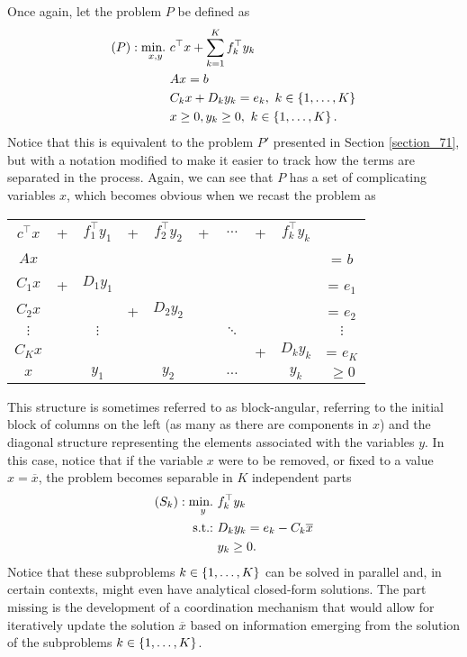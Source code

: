 Once again, let the problem $P$ be defined as
%
\begin{align*}
	(P) :\mathop{\text{min.~}}_{x,y} & c^\top x + \sum_{k=1}^K f_k^\top y_k \\
		  			 & Ax = b \\
		  			 & C_k x + D_k y_k = e_k, \ k \in \left\{ 1, \dots, K \right \} \\
		  			 & x \geq 0, y_k \geq 0, \ k \in \left\{ 1,\dots, K \right \}. 
\end{align*}
%
Notice that this is equivalent to the problem $P'$ presented in Section \ref{section_71}, but with a notation modified to make it easier to track how the terms are separated in the process. Again, we can see that $P$ has a set of complicating variables $x$, which becomes obvious when we recast the problem as
%
\begin{center}
	\begin{tabular}{cccccccccc}
		 $c^\top x$ & + & $f_1^\top y_1$ & + & $f_2^\top y_2$ & + & $\dots$ & + & $f_k^\top y_k$  &  \\
	 	 $Ax$       &   &                &   &                &   &         &   &                 & = $b$ \\
		 $C_1 x$    & + & $D_1 y_1$      &   &                &   &         &   &                 & = $e_1$  \\
		 $C_2 x$    &   &                & + & $D_2 y_2$      &   &         &   &                 & = $e_2$    \\
		 $\vdots$   &   &  $\vdots$      &   &                &   & $\ddots$&   &                 &  $\vdots$   \\
		 $C_K x$    &   &                &   &                &   &         & + & $D_k y_k$       & = $e_K$  \\
		 $x$        &   & $y_1$          &   &  $y_2$         &   & $\dots$ &   & $y_k$           & $\geq 0$  
	\end{tabular}	
\end{center}
 
This structure is sometimes referred to as block-angular, referring to the initial block of columns on the left (as many as there are components in $x$) and the diagonal structure representing the elements associated with the variables $y$. In this case, notice that if the variable $x$ were to be removed, or fixed to a value $x = \overline{x}$, the problem becomes separable in $K$ independent parts
% 
\begin{align*} 
	(S_k) : \mathop{\text{min.~}}_y & f_k^\top y_k \\
	\mathop{\text{s.t.:~}} & D_ky_k = e_k - C_k \overline{x} \\
	& y_k \geq 0.
\end{align*}
%
Notice that these subproblems $k \in \left\{ 1,\dots, K \right \}$ can be solved in parallel and, in certain contexts, might even have analytical closed-form solutions. The part missing is the development of a coordination mechanism that would allow for iteratively update the solution $\overline{x}$ based on information emerging from the solution of the subproblems $k \in \left\{ 1,\dots, K \right \}$.

